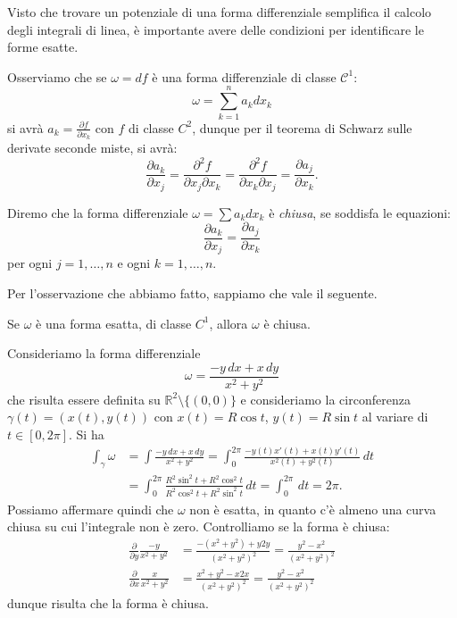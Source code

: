 \documentclass[italian,a4paper]{scrartcl}
\newcommand{\RR}{{\mathbb R}}
\begin{document}
Visto che trovare un potenziale di una forma differenziale semplifica
il calcolo degli integrali di linea, è importante avere delle
condizioni per identificare le forme esatte.

Osserviamo che se $\omega = df$ è una forma differenziale di classe
$\mathcal C^1$:
\[
 \omega = \sum_{k=1}^n a_k dx_k
\]
si avrà $a_k = \frac{\partial f}{\partial x_k}$ 
con $f$ di classe $C^2$, dunque per il teorema
di Schwarz sulle derivate seconde miste, si avrà:
\[
 \frac{\partial a_k}{\partial x_j} = \frac{\partial^2 f}{\partial x_j
   \partial x_k} = \frac{\partial^2 f}{\partial x_k \partial x_j}
=\frac{\partial a_j}{\partial x_k}.
\]

Diremo che la forma differenziale $\omega = \sum a_k dx_k$ è
\emph{chiusa}, se soddisfa le equazioni:
\[
  \frac{\partial a_k}{\partial x_j} = \frac{\partial a_j}{\partial
    x_k}
\]
per ogni $j=1,\dots, n$ e ogni $k=1,\dots,n$.

Per l'osservazione che abbiamo fatto, sappiamo che vale il seguente.
\begin{theorem}
Se $\omega$ è una forma esatta, di classe $C^1$, 
allora $\omega$ è chiusa.
\end{theorem}

\begin{example}
\label{ex:forma_chiusa_non_esatta}
Consideriamo la forma differenziale
\begin{equation}\label{eq:forma_chiusa_non_esatta}
\omega = \frac{-y\, dx + x\,
  dy}{x^2+y^2}
\end{equation}
che risulta essere definita su $\RR^2 \setminus \{(0,0)\}$ e consideriamo
la circonferenza $\gamma(t)=(x(t),y(t))$ con $x(t) = R \cos t$, $y(t)=R
\sin t$ al variare di $t\in [0,2\pi]$.
Si ha
\begin{align*}
\int_\gamma \omega & = \int \frac{-y\, dx + x\, dy}{x^2+y^2}
=\int_0^{2\pi} \frac{-y(t) x'(t) + x(t) y'(t)}{x^2(t)+y^2(t)}\, dt\\
&=\int_0^{2\pi} \frac{R^2 \sin^2 t + R^2 \cos^2 t}{R^2\cos^2 t +
  R^2\sin^2 t}\, dt = \int_0^{2\pi}\, dt = 2\pi.
\end{align*}
Possiamo affermare quindi che $\omega$ non è esatta, in quanto
c'è almeno una curva chiusa su cui l'integrale non è zero.
Controlliamo se la forma è
chiusa:
\begin{align*}
\frac{\partial}{\partial y}\frac{-y}{x^2+y^2}
& = \frac{-(x^2+y^2)+y2y}{(x^2+y^2)^2}
= \frac{y^2 - x^2}{(x^2+y^2)^2}\\
\frac{\partial}{\partial x}\frac{x}{x^2+y^2}
& = \frac{x^2+y^2-x2x}{(x^2+y^2)^2}
= \frac{y^2 - x^2}{(x^2+y^2)^2}
\end{align*}
dunque risulta che la forma è chiusa.
\end{example}
\end{document}
